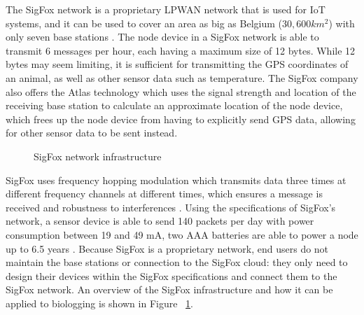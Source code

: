 \documentclass[sigplan,screen,nonacm]{acmart}
\begin{document}
The SigFox network is a proprietary LPWAN 
network that is used for IoT systems, and it can be used to cover an area as 
big as Belgium ($30,600 km^2$) with only seven base stations \cite{wild2023multi}. 
The node device in a SigFox network is able to transmit 6 messages per hour, 
each having a maximum size of 12 bytes. While 12 bytes may seem limiting, it is 
sufficient for transmitting the GPS coordinates of an animal, as well as other 
sensor data such as temperature\cite{wild2023multi}. The SigFox company also offers 
the Atlas technology which uses the signal strength and location of the receiving 
base station to calculate an approximate location of the node device, which frees up 
the node device from having to explicitly send GPS data, allowing for other sensor data 
to be sent instead\cite{wild2023multi}. 
\begin{figure}[htbp]
  \centering
  \caption{SigFox network infrastructure\cite{wild2023multi}}
  \label{fig:SigFox_infrastructure}
\end{figure}
SigFox uses frequency hopping modulation which transmits data three 
times at different frequency channels at different times, which ensures a message is received 
and robustness to interferences \cite{LavricSigfoxCommunication}. Using the specifications of SigFox's 
network, a sensor device is able to send 140 packets per day with power consumption  
between 19 and 49 mA, two AAA batteries are able to power a node up to 6.5 years
\cite{LavricSigfoxCommunication}. Because SigFox is a proprietary network, end users 
do not maintain the base stations or connection to the SigFox cloud: they only need to 
design their devices within the SigFox specifications and connect them to the SigFox network. 
An overview of the SigFox infrastructure and how it can be applied to biologging 
is shown in Figure ~\ref{fig:SigFox_infrastructure}.
\end{document}
